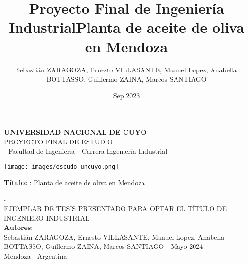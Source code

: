 \documentclass[12pt,a4paper,oneside]{book}
\title{Proyecto Final de Ingeniería Industrial}
\author{Sebastián ZARAGOZA, Ernesto VILLASANTE, Manuel Lopez, Anabella BOTTASSO, Guillermo ZAINA, Marcos SANTIAGO}
\date{Sep 2023}
\begin{document}

\marginsize{3.0cm}{3.0cm}{4.0cm}{3.0cm}
\renewcommand*{\contentsname}{ÍNDICE}
\renewcommand*{\listtablename}{Índice de tablas}
\renewcommand*{\listfigurename}{Índice de figuras}
\renewcommand{\baselinestretch}{1.0}
\renewcommand{\appendixname}{Anexos}
\renewcommand{\appendixtocname}{Anexos}
\renewcommand{\appendixpagename}{Anexos}
\renewcommand{\thetable}{\arabic{chapter}.\arabic{table}}
\renewcommand*{\tablename}{Tabla}
\renewcommand*{\chaptername}{Capítulo}
\renewcommand*{\thechapter}{\Roman{chapter}}
\renewcommand{\thesection}{\arabic{chapter}.\arabic{section}}
\renewcommand{\figurename}{Figura}
\renewcommand{\thefigure}{\arabic{chapter}.\arabic{figure}}
\renewcommand{\theequation}{\arabic{chapter}.\arabic{equation}}




\begin{titlepage}
 
\begin{center}
 
 {\huge \bf UNIVERSIDAD NACIONAL DE CUYO}\\[1.2cm]
 
{\Large PROYECTO FINAL DE ESTUDIO}\\{\Large  -  Facultad de Ingeniería - Carrera Ingeniería Industrial -}\\[2.0cm]


\begin{center}
\texttt{[image: images/escudo-uncuyo.png]}
\end{center}

\vspace{1.7cm}
{{\bf Título: }: }Planta de aceite de oliva en Mendoza
\title{Planta de aceite de oliva en Mendoza} %
{\bf \large . }\\[1.7cm] %


{EJEMPLAR DE TESIS PRESENTADO PARA OPTAR EL TÍTULO DE INGENIERO INDUSTRIAL}\\[0.5cm]
 
{{\bf Autores}: }\\[0.5cm] %

{\large Sebastián ZARAGOZA, Ernesto VILLASANTE, Manuel Lopez, Anabella BOTTASSO, Guillermo ZAINA, Marcos SANTIAGO - Mayo 2024}\\[0.8cm] %
{Mendoza - Argentina}
\end{center}

\end{titlepage}
\end{document}
